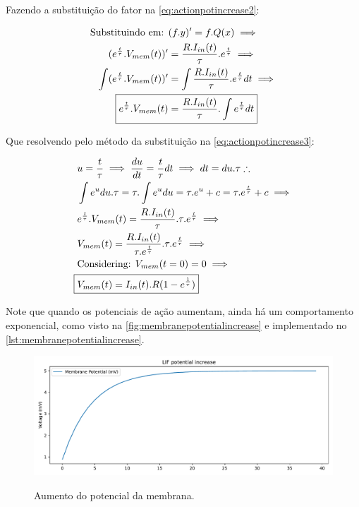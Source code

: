 			\par Fazendo a substituição do fator na \autoref{eq:actionpotincrease2}:
			
			\begin{equation}
				\label{eq:actionpotincrease2}
				\begin{aligned}
					\text{Substituindo em: } &(f.y)' = f.Q(x) \implies \\
					(e^{\frac{t}{\tau}}.V_{mem}(t))' &= \frac{R.I_{in}(t)}{\tau}.e^{\frac{t}{\tau}} \implies \\
					\int (e^{\frac{t}{\tau}}.V_{mem}(t))' &= \int \frac{R.I_{in}(t)}{\tau}.e^{\frac{t}{\tau}} dt \implies \\
					\Aboxed{e^{\frac{t}{\tau}}.V_{mem}(t) &= \frac{R.I_{in}(t)}{\tau}.\int e^{\frac{t}{\tau}} dt}
				\end{aligned}
			\end{equation}
			
			\par Que resolvendo pelo método da substituição na \autoref{eq:actionpotincrease3}:
			
			\begin{equation}
				\label{eq:actionpotincrease3}
				\begin{aligned}
					&u=\frac{t}{\tau} \implies \dfrac{du}{dt} = \dfrac{t}{\tau}dt \implies dt = du.\tau \therefore \\
					&\int e^u du.\tau = \tau.\int e^u du = \tau . e^u + c = \tau . e^{\frac{t}{\tau}} + c \implies \\
					&e^{\frac{t}{\tau}}.V_{mem}(t) = \frac{R.I_{in}(t)}{\tau}.\tau.e^{\frac{t}{\tau}} \implies \\
					&V_{mem}(t) = \frac{R.I_{in}(t)}{\tau . e^{\frac{t}{\tau}}}.\tau.e^{\frac{t}{\tau}} \implies \\
					& \text{Considering: } V_{mem}(t=0) = 0 \implies \\
					\Aboxed{&V_{mem}(t) = I_{in}(t).R(1-e^{\frac{1}{\tau}})}
				\end{aligned}
			\end{equation}
			
			
			\par Note que quando os potenciais de ação aumentam, ainda há um comportamento exponencial, como visto na  \autoref{fig:membranepotentialincrease} e implementado no  \autoref{lst:membranepotentialincrease}.
			
			
			
			\begin{figure}[H]
				\centering
				\caption{Aumento do potencial da membrana.}
				\includegraphics[width=.7\linewidth]{images/membranePotentialIncrease}
				\label{fig:membranepotentialincrease}
			\end{figure}
			
